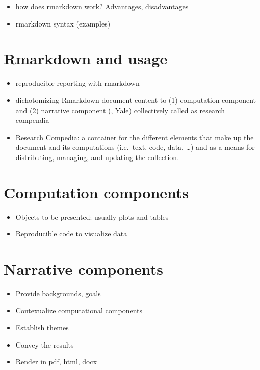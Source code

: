 \documentclass[
  12pt,
]{book}
\providecommand{\tightlist}{%
  \setlength{\itemsep}{0pt}\setlength{\parskip}{0pt}}
\begin{document}
\begin{itemize}
\tightlist
\item
  how does rmarkdown work? Advantages, disadvantages
\item
  rmarkdown syntax (examples)
\end{itemize}

\hypertarget{rmarkdown-and-usage}{%
\section{Rmarkdown and usage}\label{rmarkdown-and-usage}}

\begin{itemize}
\item
  reproducible reporting with rmarkdown
\item
  dichotomizing Rmarkdown document content to (1) computation component and (2) narrative component (\citet{MikeKane}, Yale) collectively called as research compendia
\item
  Research Compedia: a container for the different elements that make up the document and its computations (i.e.~text, code, data, \ldots) and as a means for distributing, managing, and updating the collection.
\end{itemize}

\hypertarget{computation-components}{%
\section{Computation components}\label{computation-components}}

\begin{itemize}
\tightlist
\item
  Objects to be presented: usually plots and tables
\item
  Reproducible code to visualize data
\end{itemize}

\hypertarget{narrative-components}{%
\section{Narrative components}\label{narrative-components}}

\begin{itemize}
\tightlist
\item
  Provide backgrounds, goals
\item
  Contexualize computational components
\item
  Establish themes
\item
  Convey the results
\item
  Render in pdf, html, docx
\end{itemize}
\end{document}
